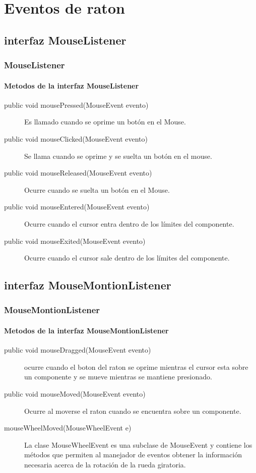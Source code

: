 \documentclass{beamer}
\begin{document}
\section{Eventos de raton}
\subsection{interfaz MouseListener}
\begin{frame}[fragile]
\frametitle{MouseListener}
\framesubtitle{Metodos de la interfaz MouseListener}
\begin{description}
\item[public  void mousePressed(MouseEvent evento)] Es llamado cuando se oprime un botón en el Mouse.
\item[public  void mouseClicked(MouseEvent evento)] Se llama cuando se oprime y se suelta un botón en el mouse.
\item[public  void mouseReleased(MouseEvent evento)] Ocurre cuando se suelta un botón en el Mouse.
\item[public  void mouseEntered(MouseEvent evento)] Ocurre cuando el cursor entra dentro de los límites del componente.
\item[public  void mouseExited(MouseEvent evento)] Ocurre cuando el cursor sale dentro de los límites del componente.               
\end{description}
\end{frame}

\subsection*{interfaz  MouseMontionListener}
\begin{frame}[fragile]
\frametitle{ MouseMontionListener}
\framesubtitle{Metodos de la interfaz  MouseMontionListener}
\begin{description}
\item[public  void mouseDragged(MouseEvent evento)] ocurre cuando el boton del raton se oprime mientras el cursor esta sobre un componente y se mueve mientras se mantiene presionado.
\item[public  void mouseMoved(MouseEvent evento)] Ocurre al moverse el raton cuando se encuentra sobre un componente.
\item[mouseWheelMoved(MouseWheelEvent e)] La clase MouseWheelEvent es una subclase de MouseEvent y contiene los métodos que permiten al manejador de eventos obtener la información necesaria acerca de la rotación de la rueda giratoria.
\end{description}
\end{frame}
\end{document}
